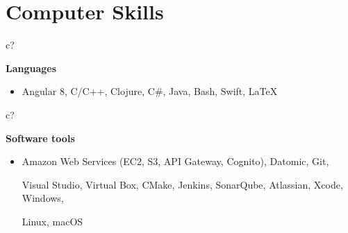 \documentclass[12pt,a4paper,sans]{moderncv} %
\begin{document}
\begin{comment}
Rank yourself on proficiency in each. I broke mine down into "Advanced Knowledge", "Working Proficiency", and "Limited Exposure"
\end{comment}

\vspace{-4 mm}
\section{Computer Skills}


 \hspace{24.5 mm}
\begin{tabular}{c?}
 \\
\end{tabular}
 \hspace{2 mm}
 \textbf{Languages}
 
\begin{itemize}
\addtolength{\itemindent}{31.7 mm}
\item{Angular 8, C/C++, Clojure, C\#, Java, Bash, Swift, \LaTeX}
\end{itemize}


 \hspace{24.5 mm}
\begin{tabular}{c?}
 \\
\end{tabular}
 \hspace{2 mm}
 \textbf{Software tools}
 
\begin{itemize}
\addtolength{\itemindent}{31.7 mm}
\item{Amazon Web Services (EC2, S3, API Gateway, Cognito), Datomic, Git, 

\hspace{30.5 mm}  Visual Studio, Virtual Box, CMake, Jenkins, SonarQube, Atlassian, Xcode, Windows, 

\hspace{30.5 mm} Linux, macOS}

 \hspace{30.5 mm}
\end{itemize}
\end{document}
